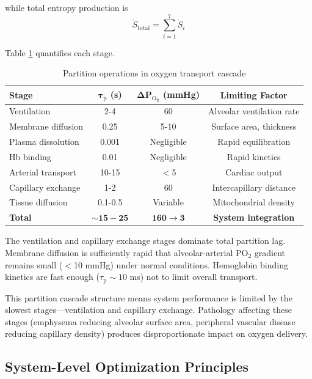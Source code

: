 \documentclass[12pt,a4paper]{article}
\theoremstyle{remark}
\newcommand{\taulag}{\tau_{\mathrm{p}}}
\begin{document}
while total entropy production is
\begin{equation}
\dot{S}_{\mathrm{total}} = \sum_{i=1}^{7} \dot{S}_{i}
\end{equation}

Table \ref{tab:integrated_partition} quantifies each stage.

\begin{table}[h]
\centering
\caption{Partition operations in oxygen transport cascade}
\label{tab:integrated_partition}
\begin{tabular}{lccc}
\toprule
\textbf{Stage} & \textbf{$\boldsymbol{\taulag}$ (s)} & \textbf{$\boldsymbol{\Delta P_{\mathrm{O}_{2}}}$ (mmHg)} & \textbf{Limiting Factor} \\
\midrule
Ventilation & 2-4 & 60 & Alveolar ventilation rate \\
Membrane diffusion & 0.25 & 5-10 & Surface area, thickness \\
Plasma dissolution & 0.001 & Negligible & Rapid equilibration \\
Hb binding & 0.01 & Negligible & Rapid kinetics \\
Arterial transport & 10-15 & $<$5 & Cardiac output \\
Capillary exchange & 1-2 & 60 & Intercapillary distance \\
Tissue diffusion & 0.1-0.5 & Variable & Mitochondrial density \\
\midrule
\textbf{Total} & $\mathbf{\sim 15-25}$ & $\mathbf{160 \to 3}$ & \textbf{System integration} \\
\bottomrule
\end{tabular}
\end{table}

The ventilation and capillary exchange stages dominate total partition lag. Membrane diffusion is sufficiently rapid that alveolar-arterial PO$_{2}$ gradient remains small ($<$10 mmHg) under normal conditions. Hemoglobin binding kinetics are fast enough ($\taulag \sim 10$ ms) not to limit overall transport.

This partition cascade structure means system performance is limited by the slowest stages—ventilation and capillary exchange. Pathology affecting these stages (emphysema reducing alveolar surface area, peripheral vascular disease reducing capillary density) produces disproportionate impact on oxygen delivery.

\subsection{System-Level Optimization Principles}
\end{document}
